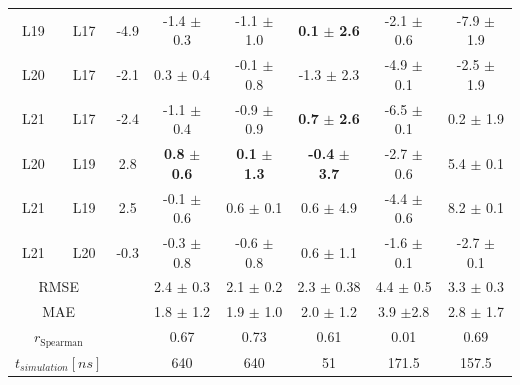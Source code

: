 \begin{table}[h]
\begin{center}
\begin{adjustbox}{max width=\textwidth}
\begin{tabular}{ c c |c |c|c|c|c|c}
        L19 &  L17 & -4.9 & -1.4 $\pm$ 0.3          & -1.1 $\pm$ 1.0         & \textbf{0.1} $\pm$ \textbf{2.6}                    &   -2.1 $\pm$ 0.6 & -7.9 $\pm$ 1.9\\
        L20 &  L17 & -2.1 &  0.3 $\pm$ 0.4          & -0.1 $\pm$ 0.8         & -1.3 $\pm$ 2.3                                     &   -4.9 $\pm$ 0.1 & -2.5 $\pm$ 1.9\\
        L21 &  L17 & -2.4 & -1.1 $\pm$ 0.4          & -0.9 $\pm$ 0.9         &\textbf{0.7} $\pm$ \textbf{2.6}                     &  -6.5 $\pm$ 0.1 &  0.2 $\pm$ 1.9\\
        L20 &  L19 & 2.8  &\textbf{0.8} $\pm$ \textbf{0.6}   & \textbf{0.1} $\pm$ \textbf{1.3} & \textbf{-0.4} $\pm$ \textbf{3.7} &  -2.7 $\pm$ 0.6 &  5.4 $\pm$ 0.1\\
        L21 &  L19 & 2.5  & -0.1 $\pm$ 0.6         &  0.6 $\pm$ 0.1         &  0.6 $\pm$ 4.9                                      &  -4.4 $\pm$ 0.6 &  8.2 $\pm$ 0.1\\
        L21 &  L20 & -0.3 & -0.3 $\pm$ 0.8         & -0.6 $\pm$ 0.8         &  0.6 $\pm$ 1.1                                    &    -1.6 $\pm$ 0.1 &   -2.7 $\pm$ 0.1\\ 
    \hline
        \multicolumn{2}{c|}{RMSE} &                    & 2.4  $\pm$ 0.3           & 2.1  $\pm$ 0.2          &  2.3  $\pm$ 0.38      & 4.4 $\pm$ 0.5         & 3.3  $\pm$ 0.3 \\
        \multicolumn{2}{c|}{MAE} &                     & 1.8 $\pm$ 1.2 & 1.9 $\pm$ 1.0 & 2.0 $\pm$ 1.2 & 3.9 $\pm$2.8 & 2.8 $\pm$ 1.7 \\
        \multicolumn{2}{c|}{$r_{\text{Spearman}}$} & & 0.67           & 0.73          & 0.61          & 0.01           & 0.69 \\
        \multicolumn{2}{c|}{$t_{simulation} [ns]$} & & 640          &  640         &  51        & 171.5         & 157.5  \\
\end{tabular}
\end{adjustbox}
\end{center}
\label{tab: RE-EDS_FE_RingCycleOpening_ddF}
\end{table}


